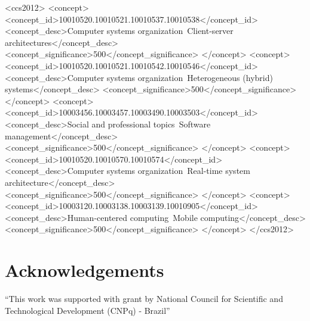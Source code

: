 \documentclass[manuscript, screen]{acmart} %
\begin{document}
%
%
\begin{CCSXML}
<ccs2012>
<concept>
<concept_id>10010520.10010521.10010537.10010538</concept_id>
<concept_desc>Computer systems organization~Client-server architectures</concept_desc>
<concept_significance>500</concept_significance>
</concept>
<concept>
<concept_id>10010520.10010521.10010542.10010546</concept_id>
<concept_desc>Computer systems organization~Heterogeneous (hybrid) systems</concept_desc>
<concept_significance>500</concept_significance>
</concept>
<concept>
<concept_id>10003456.10003457.10003490.10003503</concept_id>
<concept_desc>Social and professional topics~Software management</concept_desc>
<concept_significance>500</concept_significance>
</concept>
<concept>
<concept_id>10010520.10010570.10010574</concept_id>
<concept_desc>Computer systems organization~Real-time system architecture</concept_desc>
<concept_significance>500</concept_significance>
</concept>
<concept>
<concept_id>10003120.10003138.10003139.10010905</concept_id>
<concept_desc>Human-centered computing~Mobile computing</concept_desc>
<concept_significance>500</concept_significance>
</concept>
</ccs2012>
\end{CCSXML}


%
%




\maketitle



%
%
%






\section*{Acknowledgements}

``This work was supported with grant by National Council for Scientific and Technological Development (CNPq) - Brazil''

%


\end{document}

